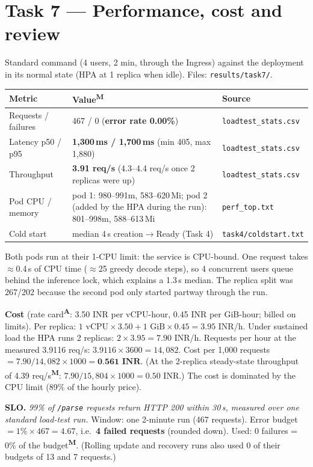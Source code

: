 \documentclass[10pt,a4paper]{article}
\newcommand{\code}[1]{\texttt{\small #1}}
\newcommand{\meas}{\textsuperscript{\textbf{M}}}
\newcommand{\assu}{\textsuperscript{\textbf{A}}}
\begin{document}
\section{Task 7 --- Performance, cost and review}
Standard command (4 users, 2 min, through the Ingress) against the deployment in its normal state (HPA at
1 replica when idle). Files: \code{results/task7/}.

\begin{center}\small
\begin{tabularx}{\textwidth}{>{\raggedright}p{3.0cm}X>{\raggedright\arraybackslash}p{3.3cm}}
\toprule
Metric & Value\meas{} & Source\\
\midrule
Requests / failures & 467 / 0 (\textbf{error rate 0.00\%}) & \code{loadtest\_stats.csv}\\
Latency p50 / p95 & \textbf{1,300\,ms / 1,700\,ms} (min 405, max 1,880) & \code{loadtest\_stats.csv}\\
Throughput & \textbf{3.91 req/s} (4.3--4.4 req/s once 2 replicas were up) & \code{loadtest\_stats.csv}\\
Pod CPU / memory & pod 1: 980--991m, 583--620\,Mi; pod 2 (added by the HPA during the run): 801--998m, 588--613\,Mi & \code{perf\_top.txt}\\
Cold start & median 4\,s creation$\to$Ready (Task 4) & \code{task4/coldstart.txt}\\
\bottomrule
\end{tabularx}
\end{center}
Both pods run at their 1-CPU limit: the service is CPU-bound. One request takes $\approx$0.4\,s of CPU time
($\approx$25 greedy decode steps), so 4 concurrent users queue behind the inference lock, which explains a
1.3\,s median. The replica split was 267/202 because the second pod only started partway through the run.

\textbf{Cost} (rate card\assu{}: 3.50 INR per vCPU-hour, 0.45 INR per GiB-hour; billed on limits).
Per replica: $1\text{ vCPU}\times3.50 + 1\text{ GiB}\times0.45 = 3.95$ INR/h. Under sustained load the HPA runs
2 replicas: $2\times3.95 = 7.90$ INR/h. Requests per hour at the measured 3.9116 req/s:
$3.9116\times3600 = 14{,}082$. Cost per 1,000 requests $= 7.90 / 14{,}082 \times 1000 = \textbf{0.561 INR}$.
(At the 2-replica steady-state throughput of 4.39 req/s\meas{}: $7.90/15{,}804\times1000 = 0.50$ INR.)
The cost is dominated by the CPU limit (89\% of the hourly price).

\textbf{SLO.} \emph{99\% of \code{/parse} requests return HTTP 200 within 30\,s, measured over one standard
load-test run.} Window: one 2-minute run (467 requests). Error budget $= 1\% \times 467 = 4.67$, i.e.\ \textbf{4
failed requests} (rounded down). Used: 0 failures = 0\% of the budget\meas{}. (Rolling update and recovery runs also used 0 of
their budgets of 13 and 7 requests.)
\end{document}
